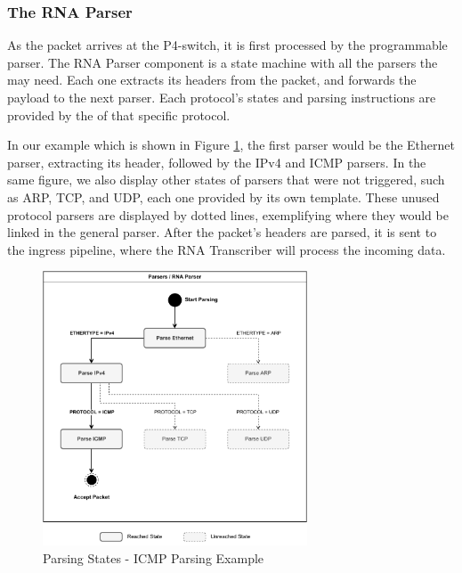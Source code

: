 \subsubsection*{The RNA Parser}

As the packet arrives at the P4-switch, it is first processed by the programmable parser. The RNA Parser component is a state machine with all the parsers the \Offloaders{} may need. Each one extracts its headers from the packet, and forwards the payload to the next parser. Each protocol's states and parsing instructions are provided by the \ProtocolTemplate{} of that specific protocol.

In our example which is shown in Figure \ref{fig:icmp_ex_parser}, the first parser would be the Ethernet parser, extracting its header, followed by the IPv4 and ICMP parsers. In the same figure, we also display other states of parsers that were not triggered, such as ARP, TCP, and UDP, each one provided by its own template. These unused protocol parsers are displayed by dotted lines, exemplifying where they would be linked in the general parser. After the packet's headers are parsed, it is sent to the ingress pipeline, where the RNA Transcriber will process the incoming data.

\begin{figure}[ht]
    \caption{Parsing States - ICMP Parsing Example}
    \begin{center}
        \includegraphics[width=0.7\textwidth]{images/icmp_ex_parser.pdf}  
    \end{center}
    \label{fig:icmp_ex_parser}
\end{figure}

